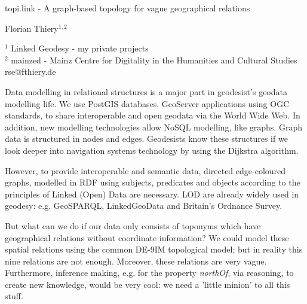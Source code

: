 \documentclass[a4paper]{article}
\begin{document}

\Large
 \begin{center}
topi.link - A graph-based topology for vague geographical relations\\ 

\hspace{10pt}

\large
Florian Thiery$^1$$^,$$^2$\\

\hspace{10pt}

\small  
$^1$ Linked Geodesy - my private projects\\
$^2$ mainzed - Mainz Centre for Digitality in the Humanities and Cultural Studies\\
rse@fthiery.de\\

\end{center}

\normalsize

Data modelling in relational structures is a major part in geodesist's geodata modelling life. We use PostGIS databases, GeoServer applications using OGC standards, to share interoperable and open geodata via the World Wide Web. In addition, new modelling technologies allow NoSQL modelling, like graphs. Graph data is structured in nodes and edges. Geodesists know these structures if we look deeper into navigation systems technology by using the Dijkstra algorithm. 

However, to provide interoperable and semantic data, directed edge-coloured graphs, modelled in RDF using subjects, predicates and objects according to the principles of Linked (Open) Data\cite{tim_linked_2006} are necessary. LOD are already widely used in geodesy\cite{hart_linked_2013}: e.g. GeoSPARQL\cite{battle_geosparql_2011}, LinkedGeoData\cite{auer_linkedgeodata_2009} and Britain’s Ordnance Survey\cite{shadbolt_linked_2012}.

But what can we do if our data only consists of toponyms which have geographical relations without coordinate information? We could model these spatial relations\cite{clementini_modelling_1994} using the common DE-9IM\cite{mark_modeling_1994} topological model; but in reality this nine relations are not enough. Moreover, these relations are very vague. Furthermore, inference making, e.g. for the property \textit{northOf}\cite{thiery_zenodo_1}, via reasoning\cite{thiery_zenodo_4}, to create new knowledge, would be very cool: we need a 'little minion' to all this stuff.
\end{document}
